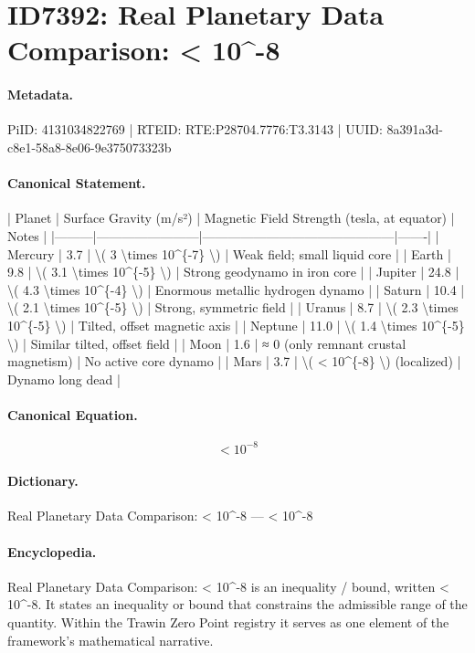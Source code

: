 \section*{ID7392: Real Planetary Data Comparison: < 10\textasciicircum{}-8}
\paragraph{Metadata.}
PiID: 4131034822769 | RTEID: RTE:P28704.7776:T3.3143 | UUID: 8a391a3d-c8e1-58a8-8e06-9e375073323b

\paragraph{Canonical Statement.}
| Planet | Surface Gravity (m/s²) | Magnetic Field Strength (tesla, at equator) | Notes | |---------|------------------------|---------------------------------------------|-------| | Mercury | 3.7 | \textbackslash{}( 3 \textbackslash{}times 10\textasciicircum{}\{-7\} \textbackslash{}) | Weak field; small liquid core | | Earth | 9.8 | \textbackslash{}( 3.1 \textbackslash{}times 10\textasciicircum{}\{-5\} \textbackslash{}) | Strong geodynamo in iron core | | Jupiter | 24.8 | \textbackslash{}( 4.3 \textbackslash{}times 10\textasciicircum{}\{-4\} \textbackslash{}) | Enormous metallic hydrogen dynamo | | Saturn | 10.4 | \textbackslash{}( 2.1 \textbackslash{}times 10\textasciicircum{}\{-5\} \textbackslash{}) | Strong, symmetric field | | Uranus | 8.7 | \textbackslash{}( 2.3 \textbackslash{}times 10\textasciicircum{}\{-5\} \textbackslash{}) | Tilted, offset magnetic axis | | Neptune | 11.0 | \textbackslash{}( 1.4 \textbackslash{}times 10\textasciicircum{}\{-5\} \textbackslash{}) | Similar tilted, offset field | | Moon | 1.6 | ≈ 0 (only remnant crustal magnetism) | No active core dynamo | | Mars | 3.7 | \textbackslash{}( < 10\textasciicircum{}\{-8\} \textbackslash{}) (localized) | Dynamo long dead |

\paragraph{Canonical Equation.}
\[
< 10^{-8}
\]

\paragraph{Dictionary.}
Real Planetary Data Comparison: < 10\textasciicircum{}-8 — < 10\textasciicircum{}-8

\paragraph{Encyclopedia.}
Real Planetary Data Comparison: < 10\textasciicircum{}-8 is an inequality / bound, written < 10\textasciicircum{}-8. It states an inequality or bound that constrains the admissible range of the quantity. Within the Trawin Zero Point registry it serves as one element of the framework's mathematical narrative.
